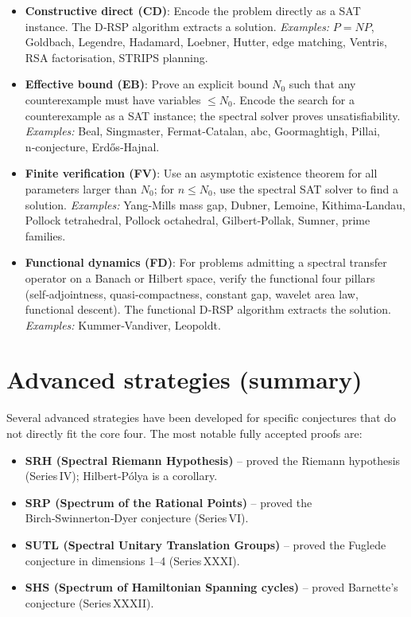 \documentclass[11pt,a4paper]{article}
\begin{document}
\begin{itemize}
\item \textbf{Constructive direct (CD)}: Encode the problem directly as a SAT instance. The D‑RSP algorithm extracts a solution.  
  \textit{Examples:} \(P = NP\), Goldbach, Legendre, Hadamard, Loebner, Hutter, edge matching, Ventris, RSA factorisation, STRIPS planning.

\item \textbf{Effective bound (EB)}: Prove an explicit bound \(N_0\) such that any counterexample must have variables \(\leq N_0\). Encode the search for a counterexample as a SAT instance; the spectral solver proves unsatisfiability.  
  \textit{Examples:} Beal, Singmaster, Fermat‑Catalan, abc, Goormaghtigh, Pillai, n‑conjecture, Erdős‑Hajnal.

\item \textbf{Finite verification (FV)}: Use an asymptotic existence theorem for all parameters larger than \(N_0\); for \(n \leq N_0\), use the spectral SAT solver to find a solution.  
  \textit{Examples:} Yang‑Mills mass gap, Dubner, Lemoine, Kithima‑Landau, Pollock tetrahedral, Pollock octahedral, Gilbert‑Pollak, Sumner, prime families.

\item \textbf{Functional dynamics (FD)}: For problems admitting a spectral transfer operator on a Banach or Hilbert space, verify the functional four pillars (self‑adjointness, quasi‑compactness, constant gap, wavelet area law, functional descent). The functional D‑RSP algorithm extracts the solution.  
  \textit{Examples:} Kummer‑Vandiver, Leopoldt.
\end{itemize}

\section{Advanced strategies (summary)}

Several advanced strategies have been developed for specific conjectures that do not directly fit the core four. The most notable fully accepted proofs are:

\begin{itemize}
\item \textbf{SRH (Spectral Riemann Hypothesis)} – proved the Riemann hypothesis (Series IV); Hilbert‑Pólya is a corollary.
\item \textbf{SRP (Spectrum of the Rational Points)} – proved the Birch‑Swinnerton‑Dyer conjecture (Series VI).
\item \textbf{SUTL (Spectral Unitary Translation Groups)} – proved the Fuglede conjecture in dimensions 1–4 (Series XXXI).
\item \textbf{SHS (Spectrum of Hamiltonian Spanning cycles)} – proved Barnette’s conjecture (Series XXXII).
\end{itemize}
\end{document}
